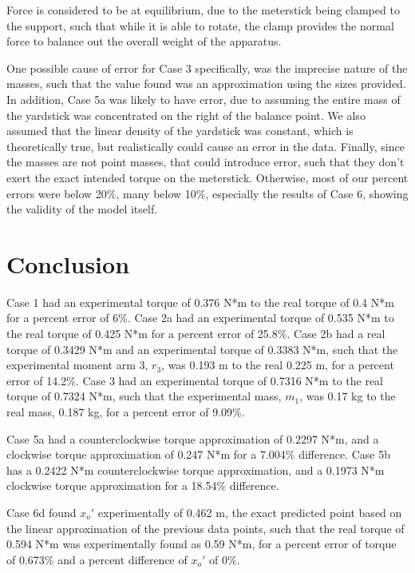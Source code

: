 \documentclass[11pt, titlepage]{article}
\begin{document}
Force is considered to be at equilibrium, due to the meterstick being clamped to the support, such that while it is able to rotate, the clamp provides the normal force to balance out the overall weight of the apparatus.

One possible cause of error for Case 3 specifically, was the imprecise nature of the masses, such that the value found was an approximation using the sizes provided. In addition, Case 5a was likely to have error, due to assuming the entire mass of the yardstick was concentrated on the right of the balance point. We also assumed that the linear density of the yardstick was constant, which is theoretically true, but realistically could cause an error in the data. Finally, since the masses are not point masses, that could introduce error, such that they don't exert the exact intended torque on the meterstick. Otherwise, most of our percent errors were below 20\%, many below 10\%, especially the results of Case 6, showing the validity of the model itself. 

\section*{Conclusion}
Case 1 had an experimental torque of 0.376 N*m to the real torque of 0.4 N*m for a percent error of 6\%. Case 2a had an experimental torque of 0.535 N*m to the real torque of 0.425 N*m for a percent error of 25.8\%. Case 2b had a real torque of 0.3429 N*m and an experimental torque of 0.3383 N*m, such that the experimental moment arm 3, $r_3$, was 0.193 m to the real 0.225 m, for a percent error of 14.2\%. Case 3 had an experimental torque of 0.7316 N*m to the real torque of 0.7324 N*m, such that the experimental mass, $m_1$, was 0.17 kg to the real mass, 0.187 kg, for a percent error of 9.09\%.

Case 5a had a counterclockwise torque approximation of 0.2297 N*m, and a clockwise torque approximation of 0.247 N*m for a 7.004\% difference. Case 5b has a 0.2422 N*m counterclockwise torque approximation, and a 0.1973 N*m clockwise torque approximation for a 18.54\% difference.

Case 6d found $x_o'$ experimentally of 0.462 m, the exact predicted point based on the linear approximation of the previous data points, such that the real torque of 0.594 N*m was experimentally found as 0.59 N*m, for a percent error of torque of 0.673\% and a percent difference of $x_o'$ of 0\%.
\end{document}
